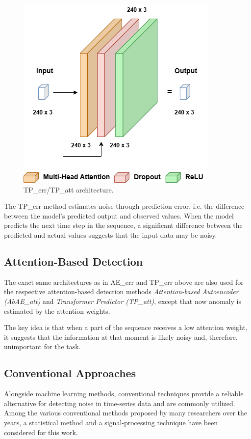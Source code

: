 \documentclass[runningheads]{llncs}
\begin{document}
\begin{figure}[tb]
\centering
\includegraphics[width=0.65\columnwidth]{images/Fig3.png}
\caption{\label{fig:Fig3} TP\_err/TP\_att architecture.}
\end{figure}

The TP\_err method estimates noise through prediction error, i.e. the
difference between the model's predicted output and observed
values. When the model predicts the next time step in the sequence, a
significant difference between the predicted and actual values
suggests that the input data may be noisy.



\subsection{Attention-Based Detection}

The exact same architectures as in AE\_err and TP\_err above are also used
for the respective attention-based detection methods
\emph{Attention-based Autoencoder (AbAE\_att)} and \emph{Transformer
Predictor (TP\_att)}, except that now anomaly is estimated by the
attention weights.

The key idea is that when a part of the sequence receives a low
attention weight, it suggests that the information at that moment is
likely noisy and, therefore, unimportant for the task.


\subsection{Conventional Approaches}

Alongside machine learning methods, conventional techniques provide a
reliable alternative for detecting noise in time-series data and are
commonly utilized. Among the various conventional methods proposed by
many researchers over the years, a statistical method and a
signal-processing technique have been considered for this work.
\end{document}
